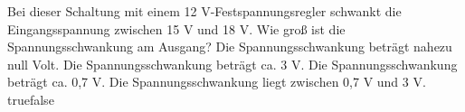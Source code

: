     {Bei dieser Schaltung mit einem 12 V-Festspannungsregler schwankt die Eingangsspannung zwischen 15 V und 18 V. Wie groß ist die Spannungsschwankung am Ausgang?}
    {Die Spannungsschwankung beträgt nahezu null Volt.}
    {Die Spannungsschwankung beträgt ca. 3 V.}
    {Die Spannungsschwankung beträgt ca. 0,7 V.}
    {Die Spannungsschwankung liegt zwischen 0,7 V und 3 V.}
    {true}{false}